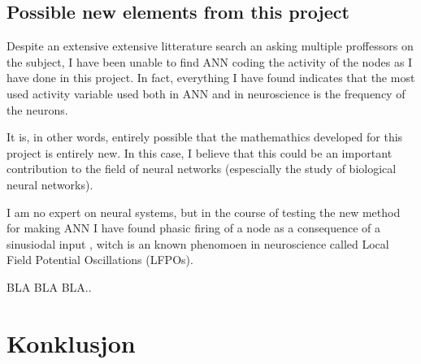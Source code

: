 	\subsection{Possible new elements from this project}
	Despite an extensive extensive litterature search an asking multiple proffessors on the subject, I have been unable to find ANN coding the activity of the nodes as I have done in this project.
	In fact, everything I have found indicates that the most used activity variable used both in ANN and in neuroscience is the frequency of the neurons.
	
	It is, in other words, entirely possible that the mathemathics developed for this project is entirely new. 
	In 	this case, I believe that this could be an important contribution to the field of neural networks (espescially the study of biological neural networks).

	I am no expert on neural systems, but in the course of testing the new method for making ANN I have found phasic firing of a node as a consequence of a sinusiodal input %
	, witch is an known phenomoen in neuroscience called Local Field Potential Oscillations (LFPOs).
	
	BLA BLA BLA..


	\section{ Konklusjon }


